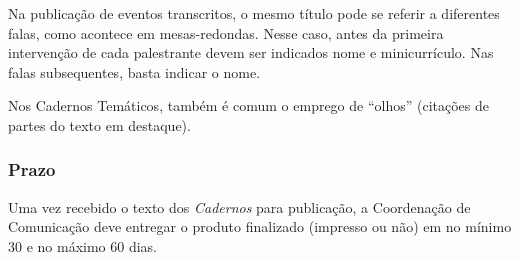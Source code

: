 Na publicação de eventos transcritos, o mesmo título pode se referir a
diferentes falas, como acontece em mesas-redondas. Nesse caso, antes da
primeira intervenção de cada palestrante devem ser indicados nome e
minicurrículo. Nas falas subsequentes, basta indicar o nome.

Nos Cadernos Temáticos, também é comum o emprego de ``olhos'' (citações
de partes do texto em destaque).

\subsubsection{Prazo}

Uma vez recebido o texto dos \emph{Cadernos} para publicação, a
Coordenação de Comunicação deve entregar o produto finalizado (impresso
ou não) em no mínimo 30 e no máximo 60 dias.